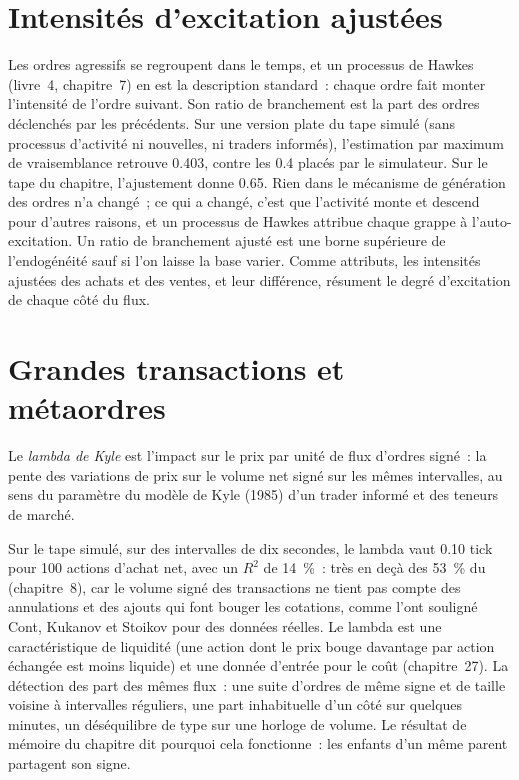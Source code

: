\section{Intensités d'excitation ajustées}

Les ordres agressifs se regroupent dans le temps, et un processus de Hawkes (livre~4, chapitre~7) en est la description standard~: chaque ordre fait monter l'intensité
de l'ordre suivant. Son ratio de branchement est la part des ordres déclenchés par les précédents. Sur une version plate du tape simulé (sans processus d'activité
ni nouvelles, ni traders informés), l'estimation par maximum de vraisemblance retrouve 0.403, contre les 0.4 placés par le simulateur. Sur le
tape du chapitre, l'ajustement donne 0.65. Rien dans le mécanisme de génération des ordres n'a changé~; ce qui a changé, c'est que l'activité monte et descend pour d'autres
raisons, et un processus de Hawkes attribue chaque grappe à l'auto-excitation. Un ratio de branchement ajusté est une borne supérieure de l'endogénéité
sauf si l'on laisse la base varier. Comme attributs, les intensités ajustées des achats et des ventes, et leur différence, résument le degré d'excitation de chaque
côté du flux.

\section{Grandes transactions et métaordres}

\begin{definition}\label{def:rs:trade-flow-features:lambda}
Le \emph{lambda de Kyle} est l'impact sur le prix par unité de flux d'ordres signé~: la pente des variations de prix sur le volume net signé
sur les mêmes intervalles, au sens du paramètre du modèle de Kyle (1985) d'un trader informé et des teneurs de marché.
\end{definition}

Sur le tape simulé, sur des intervalles de dix secondes, le lambda vaut 0.10 tick pour 100 actions d'achat net, avec un $R^2$ de 14~\%~: très en deçà des
53~\% du  (chapitre~8), car le volume signé des transactions ne tient pas compte des annulations et des ajouts qui font bouger les cotations, comme l'ont souligné Cont,
Kukanov et Stoikov pour des données réelles. Le lambda est une caractéristique de liquidité (une action dont le prix bouge davantage par action échangée est moins liquide)
et une donnée d'entrée pour le coût (chapitre~27). La détection des  part des mêmes flux~: une suite d'ordres de même signe et de taille voisine à intervalles
réguliers, une part inhabituelle d'un côté sur quelques minutes, un déséquilibre de type  sur une horloge de volume. Le résultat de mémoire du chapitre dit pourquoi cela
fonctionne~: les enfants d'un même parent partagent son signe.

